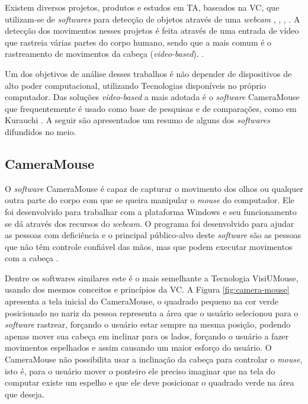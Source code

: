 
Existem diversos projetos, produtos e estudos em TA, baseados na VC, que utilizam-se de \textit{softwares} para detecção de objetos através de uma \textit{webcam} \cite{ramos2016letras} , \cite{gips2000camera}, \cite{bian2016facial}, \cite{marnik2014blinkmouse}. A detecção dos movimentos nesses projetos é feita através de uma entrada de vídeo que rastreia várias partes do corpo humano, sendo que a mais comum é o rastreamento de movimentos da cabeça (\textit{video-based}). \cite{al2013eye-UPPERCASE}. 

Um dos objetivos de análise desses trabalhos é não depender de dispositivos de alto poder computacional, utilizando Tecnologias disponíveis no próprio computador. Das soluções \textit{video-based} a mais adotada é o \textit{software} CameraMouse \cite{gips2000camera} que frequentemente é usado como base de pesquisas e de comparações, como em Kurauchi \cite{kurauchi2015hmagic}. A seguir são apresentados um resumo de alguns dos \textit{softwares} difundidos no meio.

\subsection{CameraMouse}
O \textit{software} CameraMouse é capaz de capturar o movimento dos olhos ou qualquer outra parte do corpo com que se queira manipular o \textit{mouse} do computador. Ele foi desenvolvido para trabalhar com a plataforma Windows e seu funcionamento se dá através dos recursos do \textit{webcam}. O programa foi desenvolvido para ajudar as pessoas com deficiência e o principal público-alvo deste \textit{software} são as pessoas que não têm controle confiável das mãos, mas que podem executar movimentos com a cabeça .

Dentre os softwares similares este é o mais semelhante a Tecnologia VisiUMouse, usando dos mesmos conceitos e princípios da VC. A Figura \ref{fig:camera-mouse} apresenta a tela inicial do CameraMouse, o quadrado pequeno na cor verde posicionado no nariz da pessoa representa a área que o usuário selecionou para o \textit{software} rastrear, forçando o usuário estar sempre na mesma posição, podendo apenas mover sua cabeça em inclinar para os lados, forçando o usuário a fazer movimentos espelhados  e assim causando um maior esforço do usuário. O CameraMouse não possibilita usar a inclinação da cabeça para controlar o \textit{mouse}, isto é, para o usuário mover o ponteiro ele preciso imaginar que na tela do computar existe um espelho e que ele deve posicionar o quadrado verde na área que deseja.

